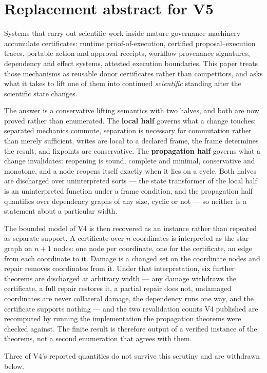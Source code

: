 \section{Replacement abstract for V5}

Systems that carry out scientific work inside mature governance machinery
accumulate certificates: runtime proof-of-execution, certified
proposal--execution traces, portable action and approval receipts, workflow
provenance signatures, dependency and effect systems, attested execution
boundaries. This paper treats those mechanisms as reusable donor certificates
rather than competitors, and asks what it takes to lift one of them into
continued \emph{scientific} standing after the scientific state changes.

The answer is a conservative lifting semantics with two halves, and both are
now proved rather than enumerated. The \textbf{local half} governs what a change
touches: separated mechanics commute, separation is necessary for commutation
rather than merely sufficient, writes are local to a declared frame, the frame
determines the result, and fixpoints are conservative. The \textbf{propagation half}
governs what a change invalidates: reopening is sound, complete and minimal,
conservative and monotone, and a node reopens itself exactly when it lies on a
cycle. Both halves are discharged over uninterpreted sorts --- the state
transformer of the local half is an uninterpreted function under a frame
condition, and the propagation half quantifies over dependency graphs of any
size, cyclic or not --- so neither is a statement about a particular width.

The bounded model of V4 is then recovered as an instance rather than repeated
as separate support. A certificate over $n$ coordinates is interpreted as the
star graph on $n+1$ nodes: one node per coordinate, one for the certificate, an
edge from each coordinate to it. Damage is a changed set on the coordinate
nodes and repair removes coordinates from it. Under that interpretation, six
further theorems are discharged at arbitrary width --- any damage withdraws the
certificate, a full repair restores it, a partial repair does not, undamaged
coordinates are never collateral damage, the dependency runs one way, and the
certificate supports nothing --- and the two revalidation counts V4 published are
recomputed by running the implementation the propagation theorems were checked
against. The finite result is therefore output of a verified instance of the
theorems, not a second enumeration that agrees with them.

Three of V4's reported quantities do not survive this scrutiny and are
withdrawn below.
